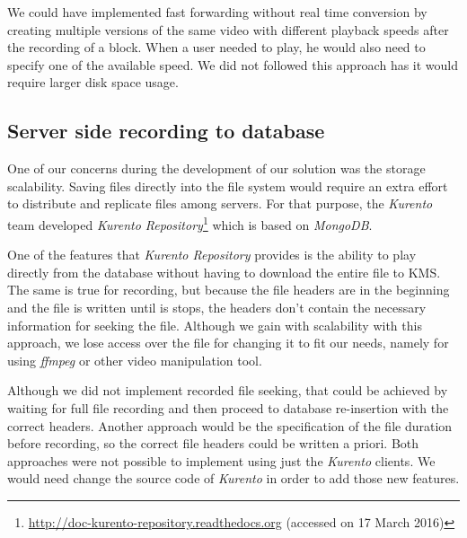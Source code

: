 	We could have implemented fast forwarding without real time conversion by creating multiple versions of the same video with different playback speeds after the recording of a block. When a user needed to play, he would also need to specify one of the available speed. We did not followed this approach has it would require larger disk space usage. 

\subsection{Server side recording to database}

	One of our concerns during the development of our solution was the storage scalability. Saving files directly into the file system would require an extra effort to distribute and replicate files among servers. For that purpose, the \emph{Kurento} team developed \emph{Kurento Repository}\footnote{\url{http://doc-kurento-repository.readthedocs.org} (accessed on 17 March 2016)} which is based on \emph{MongoDB}.

	One of the features that \emph{Kurento Repository} provides is the ability to play directly from the database without having to download the entire file to \ac{KMS}. The same is true for recording, but because the file headers are in the beginning and the file is written until is stops, the headers don't contain the necessary information for seeking the file.
	Although we gain with scalability with this approach, we lose access over the file for changing it to fit our needs, namely for using \emph{ffmpeg} or other video manipulation tool.
        
	Although we did not implement recorded file seeking, that could be achieved by waiting for full file recording and then proceed to database re-insertion with the correct headers. Another approach would be the specification of the file duration before recording, so the correct file headers could be written a priori. Both approaches were not possible to implement using just the \emph{Kurento} clients. We would need change the source code of \emph{Kurento} in order to add those new features.
        




